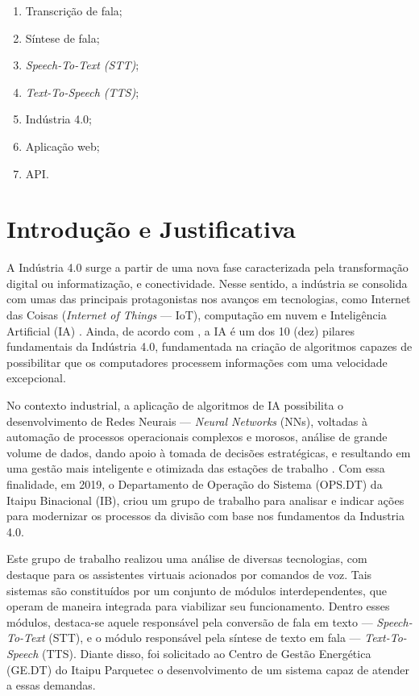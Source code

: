 \documentclass[
	12pt,				%
	a4paper,			%
	english,			%
	brazil,				%
	]{article}
\begin{document}
        \begin{enumerate}
        	\item Transcrição de fala;
        	\item Síntese de fala;
        	\item \textit{Speech-To-Text (STT)};
        	\item \textit{Text-To-Speech (TTS)};
        	\item Indústria 4.0;
        	\item Aplicação web;
        	\item API.
        \end{enumerate}



\section{Introdução e Justificativa}

A Indústria 4.0 surge a partir de uma nova fase caracterizada pela transformação digital ou informatização, e conectividade. Nesse sentido, a indústria se consolida com umas das principais protagonistas nos avanços em tecnologias, como Internet das Coisas (\textit{Internet of Things} — IoT), computação em nuvem e Inteligência Artificial (IA) \cite{basco2018}. Ainda, de acordo com , a IA é um dos 10 (dez) pilares fundamentais da Indústria 4.0, fundamentada na criação de algoritmos capazes de possibilitar que os computadores processem informações com uma velocidade excepcional.

No contexto industrial, a aplicação de algoritmos de IA possibilita o desenvolvimento de Redes Neurais — \textit{Neural Networks} (NNs), voltadas à automação de processos operacionais complexos e morosos, análise de grande volume de dados, dando apoio à tomada de decisões estratégicas, e resultando em uma gestão mais inteligente e otimizada das estações de trabalho \cite{basco2018}. Com essa finalidade, em 2019, o Departamento de Operação do Sistema (OPS.DT) da Itaipu Binacional (IB), criou um grupo de trabalho para analisar e indicar ações para modernizar os processos da divisão com base nos fundamentos da Industria 4.0.

Este grupo de trabalho realizou uma análise de diversas tecnologias, com destaque para os assistentes virtuais acionados por comandos de voz. Tais sistemas são constituídos por um conjunto de módulos interdependentes, que operam de maneira integrada para viabilizar seu funcionamento. Dentro esses módulos, destaca-se aquele responsável pela conversão de fala em texto — \textit{Speech-To-Text} (STT), e o módulo responsável pela síntese de texto em fala — \textit{Text-To-Speech} (TTS). Diante disso, foi solicitado ao Centro de Gestão Energética (GE.DT) do Itaipu Parquetec o desenvolvimento de um sistema capaz de atender a essas demandas.
\end{document}
